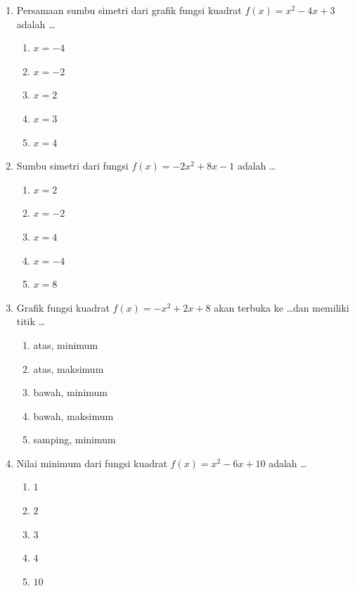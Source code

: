 \documentclass[12pt,a4paper]{article}
\begin{document}
\begin{enumerate}[leftmargin=*]
\item Persamaan sumbu simetri dari grafik fungsi kuadrat $f(x) = x^2 - 4x + 3$ adalah \dots
    \begin{enumerate}[label=\alph*.]
        \item $x = -4$
        \item $x = -2$
        \item $x = 2$
        \item $x = 3$
        \item $x = 4$
    \end{enumerate}

\item Sumbu simetri dari fungsi $f(x) = -2x^2 + 8x - 1$ adalah \dots
    \begin{enumerate}[label=\alph*.]
        \item $x = 2$
        \item $x = -2$
        \item $x = 4$
        \item $x = -4$
        \item $x = 8$
    \end{enumerate}

\item Grafik fungsi kuadrat $f(x) = -x^2 + 2x + 8$ akan terbuka ke \dots dan memiliki titik \dots
    \begin{enumerate}[label=\alph*.]
        \item atas, minimum
        \item atas, maksimum
        \item bawah, minimum
        \item bawah, maksimum
        \item samping, minimum
    \end{enumerate}

\item Nilai minimum dari fungsi kuadrat $f(x) = x^2 - 6x + 10$ adalah \dots
    \begin{enumerate}[label=\alph*.]
        \item $1$
        \item $2$
        \item $3$
        \item $4$
        \item $10$
    \end{enumerate}


\end{enumerate}
\end{document}
